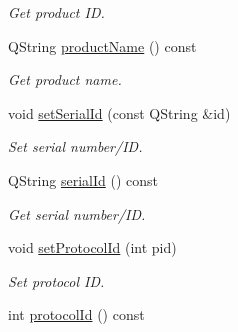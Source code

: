 \begin{DoxyCompactItemize}
\begin{DoxyCompactList}\small\item\em Get product ID. \end{DoxyCompactList}\item 
QString \hyperlink{classmdt_device_info_afe4bbdc87acff59999905a0eeb812fe1}{productName} () const 
\begin{DoxyCompactList}\small\item\em Get product name. \end{DoxyCompactList}\item 
\hypertarget{classmdt_device_info_aeefd846da860838aa5cd70a27ac961c6}{
void \hyperlink{classmdt_device_info_aeefd846da860838aa5cd70a27ac961c6}{setSerialId} (const QString \&id)}
\label{classmdt_device_info_aeefd846da860838aa5cd70a27ac961c6}

\begin{DoxyCompactList}\small\item\em Set serial number/ID. \end{DoxyCompactList}\item 
\hypertarget{classmdt_device_info_ad9c2e69d8a7b81e25ee70dff9f7086e6}{
QString \hyperlink{classmdt_device_info_ad9c2e69d8a7b81e25ee70dff9f7086e6}{serialId} () const }
\label{classmdt_device_info_ad9c2e69d8a7b81e25ee70dff9f7086e6}

\begin{DoxyCompactList}\small\item\em Get serial number/ID. \end{DoxyCompactList}\item 
\hypertarget{classmdt_device_info_ad90e39b5d34d4859527651cebb273e78}{
void \hyperlink{classmdt_device_info_ad90e39b5d34d4859527651cebb273e78}{setProtocolId} (int pid)}
\label{classmdt_device_info_ad90e39b5d34d4859527651cebb273e78}

\begin{DoxyCompactList}\small\item\em Set protocol ID. \end{DoxyCompactList}\item 
\hypertarget{classmdt_device_info_a9b3a09adc91393f3c3940f41ea0bf067}{
int \hyperlink{classmdt_device_info_a9b3a09adc91393f3c3940f41ea0bf067}{protocolId} () const }
\label{classmdt_device_info_a9b3a09adc91393f3c3940f41ea0bf067}


\end{DoxyCompactItemize}
